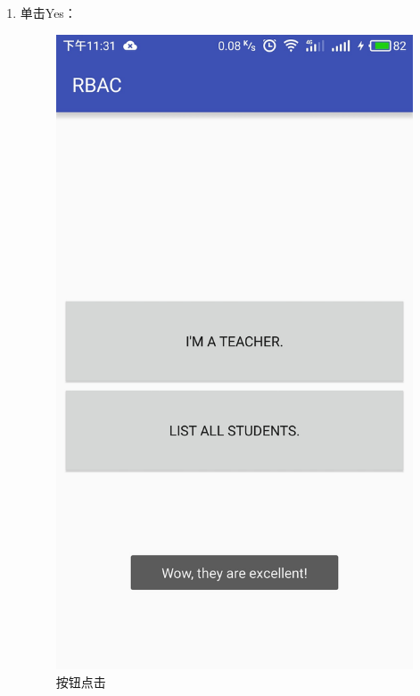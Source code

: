 \begin{itemize}
\begin{enumerate}
\begin{itemize}
\begin{enumerate}
				\item 单击Yes：
				\begin{figure}[H]
					\centering
					\includegraphics[height=0.39\textheight]{snapshot/7}
					\caption{按钮点击}
					\label{fig:7}
				\end{figure}
			

\end{enumerate}
\end{itemize}
\end{enumerate}
\end{itemize}
